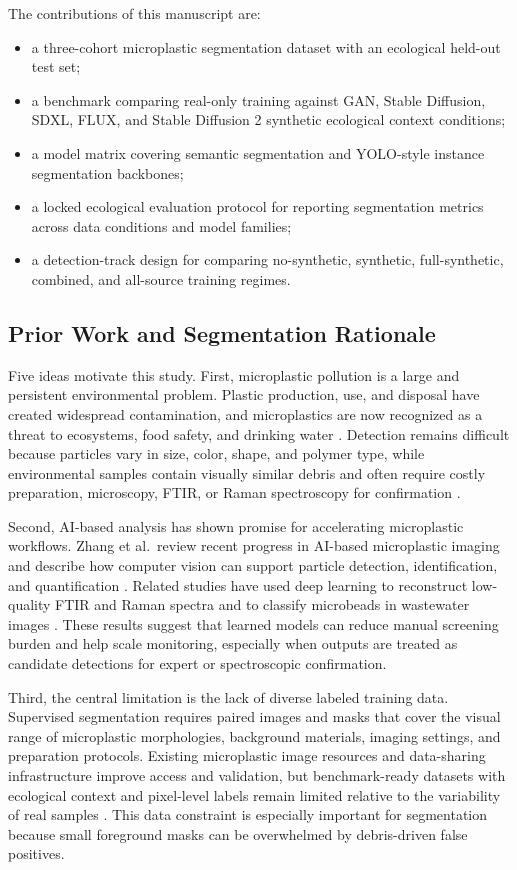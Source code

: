 \documentclass{article}
\begin{document}
The contributions of this manuscript are:
\begin{itemize}
  \item a three-cohort microplastic segmentation dataset with an ecological held-out test set;
  \item a benchmark comparing real-only training against GAN, Stable Diffusion, SDXL, FLUX, and Stable Diffusion 2 synthetic ecological context conditions;
  \item a model matrix covering semantic segmentation and YOLO-style instance segmentation backbones;
  \item a locked ecological evaluation protocol for reporting segmentation metrics across data conditions and model families;
  \item a detection-track design for comparing no-synthetic, synthetic, full-synthetic, combined, and all-source training regimes.
\end{itemize}

\subsection{Prior Work and Segmentation Rationale}

Five ideas motivate this study. First, microplastic pollution is a large and persistent environmental problem. Plastic production, use, and disposal have created widespread contamination, and microplastics are now recognized as a threat to ecosystems, food safety, and drinking water \cite{geyer2017,ziani2023}. Detection remains difficult because particles vary in size, color, shape, and polymer type, while environmental samples contain visually similar debris and often require costly preparation, microscopy, FTIR, or Raman spectroscopy for confirmation \cite{hidalgo2012,stock2020,primpke2020}.

Second, AI-based analysis has shown promise for accelerating microplastic workflows. Zhang et al.\ review recent progress in AI-based microplastic imaging and describe how computer vision can support particle detection, identification, and quantification \cite{zhang2023}. Related studies have used deep learning to reconstruct low-quality FTIR and Raman spectra and to classify microbeads in wastewater images \cite{brandt2021,yurtsever2019}. These results suggest that learned models can reduce manual screening burden and help scale monitoring, especially when outputs are treated as candidate detections for expert or spectroscopic confirmation.

Third, the central limitation is the lack of diverse labeled training data. Supervised segmentation requires paired images and masks that cover the visual range of microplastic morphologies, background materials, imaging settings, and preparation protocols. Existing microplastic image resources and data-sharing infrastructure improve access and validation, but benchmark-ready datasets with ecological context and pixel-level labels remain limited relative to the variability of real samples \cite{sherrod2024,zhang2023}. This data constraint is especially important for segmentation because small foreground masks can be overwhelmed by debris-driven false positives.
\end{document}
